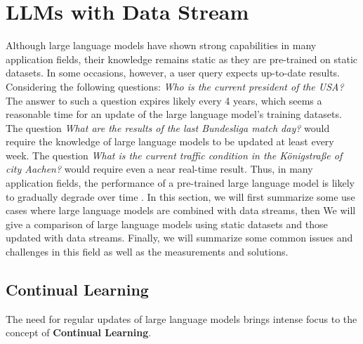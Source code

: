 \documentclass[runningheads]{llncs}
\begin{document}
\section{LLMs with Data Stream}
Although large language models have shown strong capabilities in many application fields, their knowledge remains static as they are pre-trained on static datasets. In some occasions, however, a user query
expects up-to-date results. Considering the following questions: \textit{Who is the current president of the USA?} The answer to such a question expires likely every 4 years, which seems a reasonable time
for an update of the large language model's training datasets. The question \textit{What are the results of the last Bundesliga match day?} would require the knowledge of large language models to be updated
at least every week. The question \textit{What is the current traffic condition in the Königstraße of city Aachen?} would require even a near real-time result. Thus, in many application fields, the performance of a 
pre-trained large language model is likely to gradually degrade over time \cite{Shi24}. In this section, we will first summarize some use cases where large language models are combined with data streams, then We
will give a comparison of large language models using static datasets and those updated with data streams. Finally, we will summarize some common issues and challenges in this field as well as the measurements and 
solutions.

\subsection{Continual Learning}
The need for regular updates of large language models brings intense focus to the concept of \textbf{Continual Learning}.  
\end{document}
